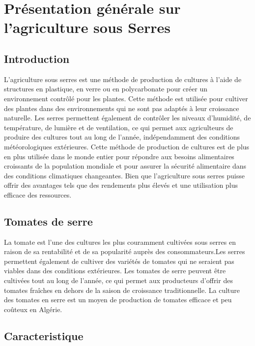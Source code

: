 \chapter{Présentation générale sur l’agriculture sous Serres} \label{chap:Présentation générale sur l’agriculture sous Serres}

\section{Introduction}
L'agriculture sous serres est une méthode de production de cultures à l'aide de structures en plastique, en verre ou en polycarbonate pour créer un environnement contrôlé pour les plantes. Cette méthode est utilisée pour cultiver des plantes dans des environnements qui ne sont pas adaptés à leur croissance naturelle.
Les serres permettent également de contrôler les niveaux d'humidité, de température, de lumière et de ventilation, ce qui permet aux agriculteurs de produire des cultures tout au long de l'année, indépendamment des conditions météorologiques extérieures. Cette méthode de production de cultures est de plus en plus utilisée dans le monde entier pour répondre aux besoins alimentaires croissants de la population mondiale et pour assurer la sécurité alimentaire dans des conditions climatiques changeantes.
Bien que l'agriculture sous serres puisse offrir des avantages tels que des rendements plus élevés et une utilisation plus efficace des ressources.

\section{Tomates de serre }
La tomate est l'une des cultures les plus couramment cultivées sous serres en raison de sa rentabilité et de sa popularité auprès des consommateurs.Les serres permettent également de cultiver des variétés de tomates qui ne seraient pas viables dans des conditions extérieures. Les tomates de serre peuvent être cultivées tout au long de l'année, ce qui permet aux producteurs d'offrir des tomates fraîches en dehors de la saison de croissance traditionnelle.
La culture des tomates en serre est un moyen de production de tomates efficace et peu
coûteux en Algérie.
\section{Caracteristique}
